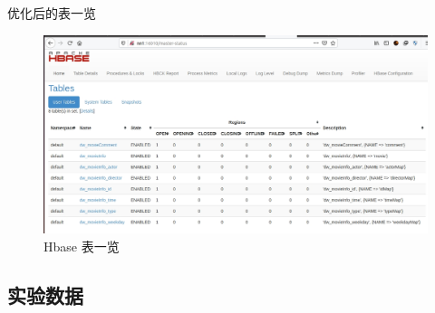 \documentclass{ctexrep}
\begin{document}
	优化后的表一览
        \begin{figure}[H]
    		\centering
    		\includegraphics[width=0.7\linewidth]{img/Hbase_tables.jpg}
    		\caption{Hbase 表一览}
    		\label{fig:Hbase_tables}
    	\end{figure}
	\subsection{实验数据}
\end{document}
